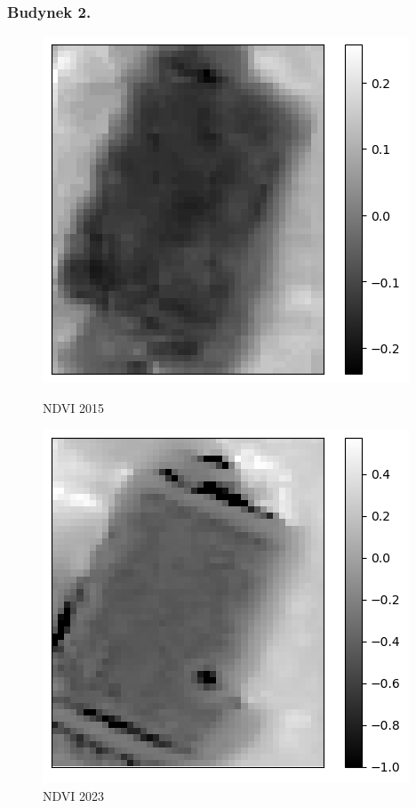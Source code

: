\documentclass[a4paper,12pt]{article}  %
\begin{document}
\newpage
\subsubsection{Budynek 2.}

\begin{figure}[H]
    \centering
    \begin{minipage}{0.45\textwidth}
        \centering
        \includegraphics[width=\linewidth]{spektralne/ndvi_budynek0_2015.png}
        \caption*{NDVI 2015}
    \end{minipage}
    \begin{minipage}{0.45\textwidth}
        \centering
        \includegraphics[width=\linewidth]{spektralne/ndvi_budynek0_2023.png}
        \caption*{NDVI 2023}
    \end{minipage}
\end{figure}
\end{document}
